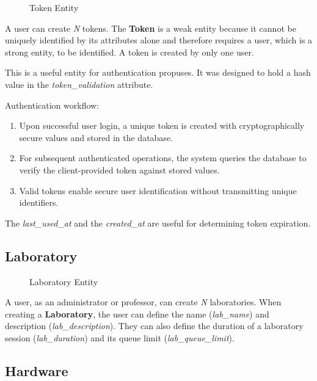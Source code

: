 \begin{figure}[H]
    \centering
    
    \caption{Token Entity}
    \label{fig:token_entity}
\end{figure}

A user can create \textit{N} tokens. The \textbf{Token} is a weak entity because it cannot be uniquely identified by its attributes alone and therefore requires a user, which is a strong entity, to be identified. A token is created by only one user.

This is a useful entity for authentication propuses. It was designed to hold a hash value in the \textit{token\_validation} attribute.

Authentication workflow:

\begin{enumerate}
    \item Upon successful user login, a unique token is created with cryptographically secure values and stored in the database.
    \item For subsequent authenticated operations, the system queries the database to verify the client-provided token against stored values.
    \item Valid tokens enable secure user identification without transmitting unique identifiers.
\end{enumerate}

The \textit{last\_used\_at} and the \textit{created\_at} are useful for determining token expiration.

\subsection*{Laboratory}

\begin{figure}[H]
    \centering
    
    \caption{Laboratory Entity}
    \label{fig:laboratory_entity}
\end{figure}

A user, as an administrator or professor, can create \textit{N} laboratories. When creating a \textbf{Laboratory}, the user can define the name (\textit{lab\_name}) and description (\textit{lab\_description}). They can also define the duration of a laboratory session (\textit{lab\_duration}) and its queue limit (\textit{lab\_queue\_limit}).

\subsection*{Hardware}

